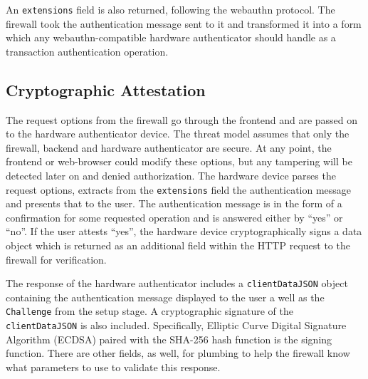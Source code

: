 An \lstinline{extensions} field is also returned, following the webauthn protocol. The firewall took the authentication message sent to it and transformed it into a form which any webauthn-compatible hardware authenticator should handle as a transaction authentication operation.



\subsection{Cryptographic Attestation}

The request options from the firewall go through the frontend and are passed on to the hardware authenticator device. The threat model assumes that only the firewall, backend and hardware authenticator are secure. At any point, the frontend or web-browser could modify these options, but any tampering will be detected later on and denied authorization. The hardware device parses the request options, extracts from the \lstinline{extensions} field the authentication message and presents that to the user. The authentication message is in the form of a confirmation for some requested operation and is answered either by ``yes'' or ``no''. If the user attests ``yes'', the hardware device cryptographically signs a data object which is returned as an additional field within the HTTP request to the firewall for verification.

The response of the hardware authenticator includes a \lstinline{clientDataJSON} object containing the authentication message displayed to the user a well as the \lstinline{Challenge} from the setup stage. A cryptographic signature of the \lstinline{clientDataJSON} is also included. Specifically, Elliptic Curve Digital Signature Algorithm (ECDSA) paired with the SHA-256 hash function is the signing function. There are other fields, as well, for plumbing to help the firewall know what parameters to use to validate this response.

